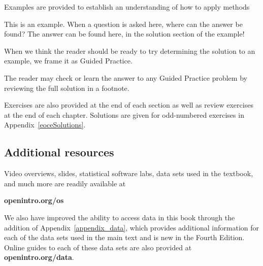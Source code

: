 \noindent%
Examples are provided to establish an understanding of how
to apply methods

\begin{examplewrap}
\begin{nexample}{This is an example.
    When a question is asked here, where can the answer be found?}
  The answer can be found here, in the solution section
  of the example!
\end{nexample}
\end{examplewrap}

\noindent%
When we think the reader should be ready to try determining
the solution to an example, we frame it as Guided Practice.

\begin{exercisewrap}
\begin{nexercise}
The reader may check or learn the answer to any Guided Practice
problem by reviewing the full solution in a footnote.\footnotemark{}
\end{nexercise}
\end{exercisewrap}

\noindent%
Exercises are also provided at the end of each section
as well as review exercises at the end of each chapter.
Solutions are given for odd-numbered exercises in
Appendix~\ref{eoceSolutions}.


\subsection*{Additional resources}

Video overviews, slides, statistical software labs,
data sets used in the textbook,
and much more are readily available at\\[-5mm]
\begin{center}
    {\color{black}\textbf{openintro.org/os}}
\end{center}
We also have improved the ability to access data in this book
through the addition of Appendix~\ref{appendix_data},
which provides additional information for each of the data sets
used in the main text and is new in the Fourth Edition.
Online guides to each of these data sets are also provided at
    {\color{black}\textbf{openintro.org/data}}. \vspace{3mm}

